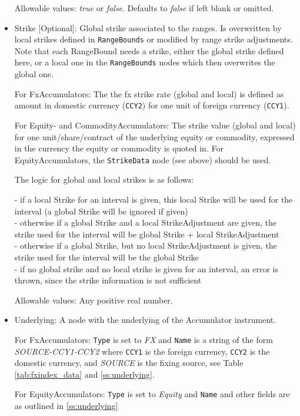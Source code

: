 \begin{itemize}
    Allowable values: \emph{true} or \emph{false}. Defaults to \emph{false} if left blank or omitted.

\item Strike [Optional]: Global strike associated to the ranges.  Is overwritten by local strikes defined in \lstinline!RangeBounds! or modified by range strike adjustments. Note that each RangeBound needs a strike, either the global strike defined here, or a local one in the \lstinline!RangeBounds! nodes which then overwrites the global one.

For FxAccumulators: The the fx strike rate (global and local) is defined as amount in domestic currency (\lstinline!CCY2!) for one unit of foreign currency (\lstinline!CCY1!). 

For Equity- and CommodityAccumulators: The strike value (global and local) for one unit/share/contract of the underlying equity or commodity, expressed in the currency the equity or commodity is quoted in. For EquityAccumulators, the \lstinline!StrikeData! node (see above) should be used.

The logic for global and local strikes is as follows:

- if a local Strike for an interval is given, this local Strike will be used for the interval (a global Strike will be ignored if given)\\
- otherwise if a global Strike and a local StrikeAdjustment are given, the strike used for the interval will be global Strike + local StrikeAdjustment\\
- otherwise if a global Strike, but no local StrikeAdjustment is given, the strike used for the interval will be the global Strike\\
- if no global strike and no local strike is given for an interval, an error is thrown, since the strike information is not sufficient  

    Allowable values: Any positive real number.
    
\item Underlying: A node with the underlying of the Accumulator instrument.

For FxAccumulators: \lstinline!Type! is set to \emph{FX} and \lstinline!Name! is a string of the form \emph{SOURCE-CCY1-CCY2} where \lstinline!CCY1! is the foreign currency, \lstinline!CCY2! is the domestic currency, and \emph{SOURCE} is the fixing source, see Table \ref{tab:fxindex_data} and  \ref{ss:underlying}.

For EquityAccumulators: \lstinline!Type! is set to \emph{Equity} and \lstinline!Name! and other fields are as outlined in \ref{ss:underlying}


\end{itemize}
